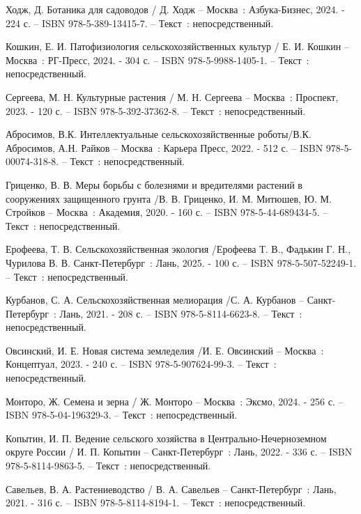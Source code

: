 
\begin{thebibliography}{9}
	 Ходж, Д. Ботаника для садоводов / Д. Ходж – Москва~: Азбука-Бизнес, 2024. - 224 с. – ISBN 978-5-389-13415-7. – Текст~: непосредственный.
	
	 Кошкин, Е. И. Патофизиология сельскохозяйственных культур / Е. И. Кошкин – Москва~: РГ-Пресс, 2024. - 304 с. – ISBN 978-5-9988-1405-1. – Текст~: непосредственный.	
	
	 Сергеева, М. Н. Культурные растения / М. Н. Сергеева – Москва~: Проспект, 2023. - 120 с. – ISBN 978-5-392-37362-8. – Текст~: непосредственный.	
	
	 Абросимов, В.К. Интеллектуальные сельскохозяйственные роботы/В.К. Абросимов, А.Н. Райков – Москва~: Карьера Пресс, 2022. - 512 с. – ISBN 978-5-00074-318-8. – Текст~: непосредственный.	

	  Гриценко, В. В. Меры борьбы с болезнями и вредителями растений в сооружениях защищенного грунта /В. В. Гриценко, И. М. Митюшев, Ю. М. Стройков  – Москва~: Академия, 2020. - 160 с. – ISBN 978-5-44-689434-5. – Текст~: непосредственный.	
	
	 Ерофеева, Т. В. Сельскохозяйственная экология /Ерофеева Т. В., Фадькин Г. Н., Чурилова В. В.  Санкт-Петербург~: Лань, 2025. - 100 с. – ISBN 978-5-507-52249-1. – Текст~: непосредственный.	
	
	 Курбанов, С. А. Сельскохозяйственная мелиорация /С. А. Курбанов  – Санкт-Петербург~: Лань, 2021. - 208 с. – ISBN 978-5-8114-6623-8. – Текст~: непосредственный.	
	
	 Овсинский, И. Е. Новая система земледелия /И. Е. Овсинский  – Москва~: Концептуал, 2023. - 240 с. – ISBN 978-5-907624-99-3. – Текст~: непосредственный.	
	
	 Монторо, Ж. Семена и зерна / Ж. Монторо  – Москва~: Эксмо, 2024. - 256 с. – ISBN 978-5-04-196329-3. – Текст~: непосредственный.
	
	Копытин, И. П. Ведение сельского хозяйства в Центрально-Нечерноземном округе России / И. П. Копытин  – Санкт-Петербург~: Лань, 2022. - 336 с. – ISBN 978-5-8114-9863-5. – Текст~: непосредственный.	
	
	Савельев, В. А. Растениеводство / В. А. Савельев  – Санкт-Петербург~: Лань, 2021. - 316 с. – ISBN 978-5-8114-8194-1. – Текст~: непосредственный.	
	

\end{thebibliography}
